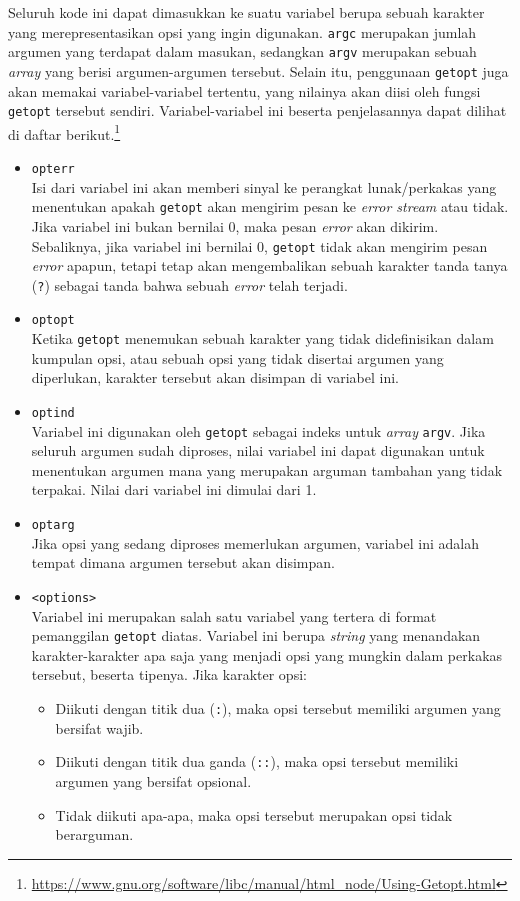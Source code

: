 Seluruh kode ini dapat dimasukkan ke suatu variabel berupa sebuah karakter yang merepresentasikan opsi yang ingin digunakan. \verb|argc| merupakan jumlah argumen yang terdapat dalam masukan, sedangkan \verb|argv| merupakan sebuah \textit{array} yang berisi argumen-argumen tersebut.
\newline\newline
Selain itu, penggunaan \verb|getopt| juga akan memakai variabel-variabel tertentu, yang nilainya akan diisi oleh fungsi \verb|getopt| tersebut sendiri. Variabel-variabel ini beserta penjelasannya dapat dilihat di daftar berikut.\footnote{\href{https://www.gnu.org/software/libc/manual/html\_node/Using-Getopt.html}{https://www.gnu.org/software/libc/manual/html\_node/Using-Getopt.html}}
\begin{itemize}
	\item \verb|opterr|\\
	Isi dari variabel ini akan memberi sinyal ke perangkat lunak/perkakas yang menentukan apakah \verb|getopt| akan mengirim pesan ke \textit{error stream} atau tidak. Jika variabel ini bukan bernilai 0, maka pesan \textit{error} akan dikirim. Sebaliknya, jika variabel ini bernilai 0, \verb|getopt| tidak akan mengirim pesan \textit{error} apapun, tetapi tetap akan mengembalikan sebuah karakter tanda tanya (\verb|?|) sebagai tanda bahwa sebuah \textit{error} telah terjadi.
	\item \verb|optopt|\\
	Ketika \verb|getopt| menemukan sebuah karakter yang tidak didefinisikan dalam kumpulan opsi, atau sebuah opsi yang tidak disertai argumen yang diperlukan, karakter tersebut akan disimpan di variabel ini.
	\item \verb|optind|\\
	Variabel ini digunakan oleh \verb|getopt| sebagai indeks untuk \textit{array} \verb|argv|. Jika seluruh argumen sudah diproses, nilai variabel ini dapat digunakan untuk menentukan argumen mana yang merupakan arguman tambahan yang tidak terpakai. Nilai dari variabel ini dimulai dari 1.
	\item \verb|optarg|\\
	Jika opsi yang sedang diproses memerlukan argumen, variabel ini adalah tempat dimana argumen tersebut akan disimpan.
	\item \verb|<options>|\\
	Variabel ini merupakan salah satu variabel yang tertera di format pemanggilan \verb|getopt| diatas. Variabel ini berupa \textit{string} yang menandakan karakter-karakter apa saja yang menjadi opsi yang mungkin dalam perkakas tersebut, beserta tipenya. Jika karakter opsi:
	
	\begin{itemize}
		\item Diikuti dengan titik dua (\verb|:|), maka opsi tersebut memiliki argumen yang bersifat wajib.
		\item Diikuti dengan titik dua ganda (\verb|::|), maka opsi tersebut memiliki argumen yang bersifat opsional.
		\item Tidak diikuti apa-apa, maka opsi tersebut merupakan opsi tidak berarguman.
	\end{itemize}
	
\end{itemize}
